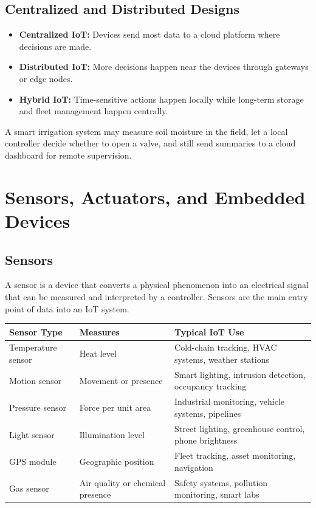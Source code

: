 \documentclass[11pt,a4paper]{article}
\begin{document}
\subsection{Centralized and Distributed Designs}

\begin{itemize}[leftmargin=*]
  \item \textbf{Centralized IoT:} Devices send most data to a cloud platform where decisions are made.
  \item \textbf{Distributed IoT:} More decisions happen near the devices through gateways or edge nodes.
  \item \textbf{Hybrid IoT:} Time-sensitive actions happen locally while long-term storage and fleet management happen centrally.
\end{itemize}

\begin{examplebox}
A smart irrigation system may measure soil moisture in the field, let a local controller decide whether to open a valve, and still send summaries to a cloud dashboard for remote supervision.
\end{examplebox}

\section{Sensors, Actuators, and Embedded Devices}

\subsection{Sensors}

\begin{definitionbox}[Sensor]
A sensor is a device that converts a physical phenomenon into an electrical signal that can be measured and interpreted by a controller. Sensors are the main entry point of data into an IoT system.
\end{definitionbox}

\begin{longtable}{p{3.1cm}p{3.8cm}p{5.8cm}}
\toprule
\textbf{Sensor Type} & \textbf{Measures} & \textbf{Typical IoT Use} \\
\midrule
Temperature sensor & Heat level & Cold-chain tracking, HVAC systems, weather stations \\
Motion sensor & Movement or presence & Smart lighting, intrusion detection, occupancy tracking \\
Pressure sensor & Force per unit area & Industrial monitoring, vehicle systems, pipelines \\
Light sensor & Illumination level & Street lighting, greenhouse control, phone brightness \\
GPS module & Geographic position & Fleet tracking, asset monitoring, navigation \\
Gas sensor & Air quality or chemical presence & Safety systems, pollution monitoring, smart labs \\
\bottomrule
\end{longtable}
\end{document}

